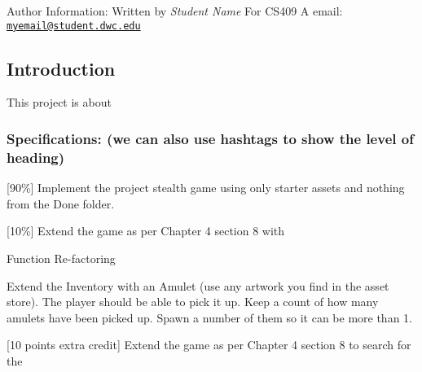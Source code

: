 Author Information\+: Written by {\itshape Student Name} For C\+S409 A email\+: \href{mailto:myemail@student.dwc.edu}{\tt myemail@student.\+dwc.\+edu}

\subsection*{Introduction }

This project is about

\subsubsection*{Specifications\+: (we can also use hashtags to show the level of heading)}


\begin{DoxyItemize}
\item \mbox{[}90\%\mbox{]} Implement the project stealth game using only starter assets and nothing from the Done folder.
\item \mbox{[}10\%\mbox{]} Extend the game as per Chapter 4 section 8 with
\begin{DoxyEnumerate}
\item Function Re-\/factoring
\item Extend the Inventory with an Amulet (use any artwork you find in the asset store). The player should be able to pick it up. Keep a count of how many amulets have been picked up. Spawn a number of them so it can be more than 1.
\end{DoxyEnumerate}
\item \mbox{[}10 points extra credit\mbox{]} Extend the game as per Chapter 4 section 8 to search for the 
\end{DoxyItemize}